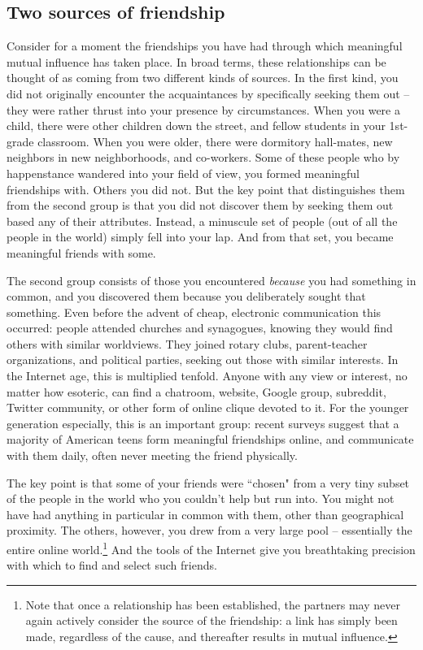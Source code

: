 
\subsection{Two sources of friendship}

Consider for a moment the friendships you have had through which meaningful
mutual influence has taken place. In broad terms, these relationships can be
thought of as coming from two different kinds of sources. In the first kind,
you did not originally encounter the acquaintances by specifically seeking
them out -- they were rather thrust into your presence by circumstances. When
you were a child, there were other children down the street, and fellow
students in your 1st-grade classroom. When you were older, there were
dormitory hall-mates, new neighbors in new neighborhoods, and co-workers. Some
of these people who by happenstance wandered into your field of view, you
formed meaningful friendships with. Others you did not. But the key point that
distinguishes them from the second group is that you did not discover them by
seeking them out based any of their attributes. Instead, a minuscule set of
people (out of all the people in the world) simply fell into your lap. And
from that set, you became meaningful friends with some.

The second group consists of those you encountered \textit{because} you had
something in common, and you discovered them because you deliberately sought
that something. Even before the advent of cheap, electronic communication this
occurred: people attended churches and synagogues, knowing they would find
others with similar worldviews. They joined rotary clubs, parent-teacher
organizations, and political parties, seeking out those with similar
interests. In the Internet age, this is multiplied tenfold. Anyone with any
view or interest, no matter how esoteric, can find a chatroom, website, Google
group, subreddit, Twitter community, or other form of online clique devoted to
it. For the younger generation especially, this is an important group: recent
surveys suggest that a majority of American teens form meaningful friendships
online, and communicate with them daily, often never meeting the friend
physically.\cite{amanda_lenhart_teens_2015}

The key point is that some of your friends were ``chosen" from a very tiny
subset of the people in the world who you couldn't help but run into. You
might not have had anything in particular in common with them, other than
geographical proximity. The others, however, you drew from a very large pool
-- essentially the entire online world.\footnote{Note that once a relationship
has been established, the partners may never again actively consider the
source of the friendship: a link has simply been made, regardless of the
cause, and thereafter results in mutual influence.} And the tools of the
Internet give you breathtaking precision with which to find and select such
friends.


